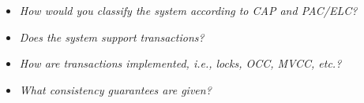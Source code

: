 
\begin{itemize}
\item \emph{How would you classify the system according to CAP and PAC/ELC?}
\item \emph{Does the system support transactions?}
\item \emph{How are transactions implemented, i.e., locks, OCC, MVCC, etc.?}
\item \emph{What consistency guarantees are given?}
\end{itemize}